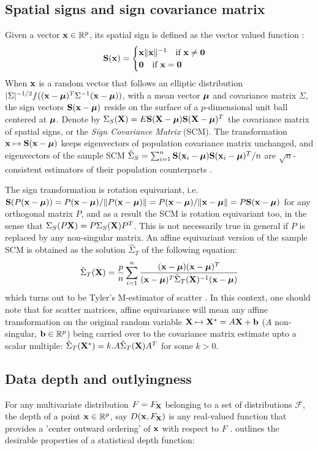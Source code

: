 \documentclass[fleqn,11pt]{article}
\begin{document}
\subsection{Spatial signs and sign covariance matrix}
Given a vector ${\bf{x}} \in \mathbb{R}^p$, its spatial sign is defined as the vector valued function \citep{MottonenOja95}:
%
$$ {\mathbf{S}}({\bf{x}}) = \begin{cases} {\bf{x}}\| {\bf{x}} \|^{-1} \quad \mbox{if }{\bf{x}} \neq \bf0\\
\bf0 \quad \mbox{if }{\bf{x}} = \bf0 \end{cases} $$
%
When ${\bf{x}}$ is a random vector that follows an elliptic distribution $|\Sigma|^{-1/2} f(({\bf{x}} - {\boldsymbol{\mu}})^T \Sigma^{-1} ({\bf{x}} - {\boldsymbol{\mu}}))$, with a mean vector ${\boldsymbol{\mu}}$ and covariance matrix $\Sigma$, the sign vectors ${\mathbf{S}}({\bf{x}} - {\boldsymbol{\mu}})$ reside on the surface of a $p$-dimensional unit ball centered at ${\boldsymbol{\mu}}$. Denote by $\Sigma_S({\mathbf{X}}) = E{\mathbf{S}} ({\mathbf{X}} - {\boldsymbol{\mu}}){\mathbf{S}} ({\mathbf{X}} - {\boldsymbol{\mu}})^T$ the covariance matrix of spatial signs, or the \textit{Sign Covariance Matrix} (SCM). The transformation ${\bf{x}} \mapsto {\mathbf{S}}({\bf{x}} - {\boldsymbol{\mu}})$ keeps eigenvectors of population covariance matrix unchanged, and eigenvectors of the sample SCM $ \hat \Sigma_S = \sum_{i=1}^n {\mathbf{S}} ({\bf{x}}_i - {\boldsymbol{\mu}}){\mathbf{S}} ({\bf{x}}_i - {\boldsymbol{\mu}})^T/n $ are $\sqrt n$-consistent estimators of their population counterparts \citep{taskinen12}.

The sign transformation is rotation equivariant, i.e. $ {\mathbf{S}}(P ({\bf{x}} - {\boldsymbol{\mu}})) = P({\bf{x}} - {\boldsymbol{\mu}})/\| P ({\bf{x}} - {\boldsymbol{\mu}})\| = P({\bf{x}} - {\boldsymbol{\mu}})/\|{\bf{x}} - {\boldsymbol{\mu}}\| = P {\mathbf{S}}({\bf{x}} - {\boldsymbol{\mu}})$ for any orthogonal matrix $P$, and as a result the SCM is rotation equivariant too, in the sense that $\Sigma_S(P{\mathbf{X}}) = P \Sigma_S({\mathbf{X}}) P^T$. This is not necessarily true in general if $P$ is replaced by any non-singular matrix. An affine equivariant version of the sample SCM is obtained as the solution $\hat \Sigma_T$ of the following equation:
%
$$ \hat \Sigma_T({\mathbf{X}}) = \frac{p}{n} \sum_{i=1}^n \frac{({\bf{x}} - {\boldsymbol{\mu}})({\bf{x}} - {\boldsymbol{\mu}})^T}{({\bf{x}} - {\boldsymbol{\mu}})^T \hat\Sigma_T({\mathbf{X}})^{-1} ({\bf{x}} - {\boldsymbol{\mu}})} $$
%
which turns out to be Tyler's M-estimator of scatter \citep{tyler87}. In this context, one should note that for scatter matrices, affine equivariance will mean any affine transformation on the original random variable ${\mathbf{X}} \mapsto {\mathbf{X}}^* = A{\mathbf{X}} + {\bf{b}}$ ($A$ non-singular, ${\bf{b}} \in \mathbb{R}^p$) being carried over to the covariance matrix estimate upto a scalar multiple: $\hat\Sigma_T({\mathbf{X}}^*) = k. A \hat\Sigma_T({\mathbf{X}}) A^T$ for some $k>0$.

\subsection{Data depth and outlyingness}
For any multivariate distribution $F = F_{\mathbf{X}}$ belonging to a set of distributions $\mathcal F$, the depth of a point ${\bf{x}} \in \mathbb{R}^p$, say $D({\bf{x}}, F_{\mathbf{X}})$ is any real-valued function that provides a 'center outward ordering' of ${\bf{x}}$ with respect to $F$ \citep{zuo00}. \cite{liu90} outlines the desirable properties of a statistical depth function:
\end{document}
